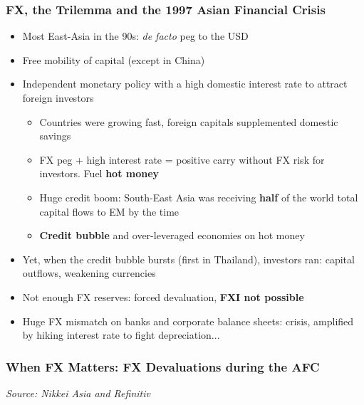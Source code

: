 \documentclass{beamer}
\begin{document}
\begin{frame}
  \frametitle{FX, the Trilemma and the 1997 Asian Financial Crisis}

  \begin{itemize}
    \item Most East-Asia in the 90s: \emph{de facto} peg to the USD
    \item Free mobility of capital (except in China)
    \item Independent monetary policy with a high domestic interest rate to attract foreign investors
      \begin{itemize}
      \item Countries were growing fast, foreign capitals supplemented domestic savings
      \item FX peg + high interest rate = positive carry without FX risk for investors. Fuel \textbf{hot money}
      \item Huge credit boom: South-East Asia was receiving \textbf{half} of the world total capital flows to EM by the time
      \item \textbf{Credit bubble} and over-leveraged economies on hot money
      \end{itemize}
    \item Yet, when the credit bubble bursts (first in Thailand), investors ran: capital outflows, weakening currencies
    \item Not enough FX reserves: forced devaluation, \textbf{FXI not possible}
    \item Huge FX mismatch on banks and corporate balance sheets: crisis, amplified by hiking interest rate to fight depreciation...
  \end{itemize}
    
\end{frame}



\begin{frame}
\frametitle{When FX Matters: FX Devaluations during the AFC}
\medskip
\emph{Source: Nikkei Asia and Refinitiv}
\end{frame}
\end{document}
